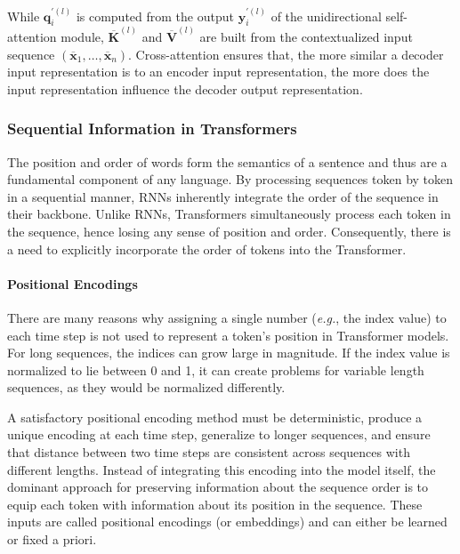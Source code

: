 \noindent While $\bm{q}^{\prime(l)}_i$ is computed from the output $\bm{y}^{\prime(l)}_i$ of the unidirectional self-attention module, $\overline{\bm{K}}^{(l)}$ and $\overline{\bm{V}}^{(l)}$ are built from the contextualized input sequence $(\overline{\bm{x}}_1, \ldots, \overline{\bm{x}}_n)$. Cross-attention ensures that, the more similar a decoder input representation is to an encoder input representation, the more does the input representation influence the decoder output representation.



\subsubsection{Sequential Information in Transformers}

The position and order of words form the semantics of a sentence and thus are a fundamental component of any language. By processing sequences token by token in a sequential manner, \acp{RNN} inherently integrate the order of the sequence in their backbone. Unlike \acp{RNN}, Transformers simultaneously process each token in the sequence, hence losing any sense of position and order. Consequently, there is a need to explicitly incorporate the order of tokens into the Transformer.

\paragraph{Positional Encodings} There are many reasons why assigning a single number (\textit{e.g.}, the index value) to each time step is not used to represent a token's position in Transformer models. For long sequences, the indices can grow large in magnitude. If the index value is normalized to lie between 0 and 1, it can create problems for variable length sequences, as they would be normalized differently. 

A satisfactory positional encoding method must be deterministic, produce a unique encoding at each time step, generalize to longer sequences, and ensure that distance between two time steps are consistent across sequences with different lengths. Instead of integrating this encoding into the model itself, the dominant approach for preserving information about the sequence order is to equip each token with information about its position in the sequence. These inputs are called positional encodings (or embeddings) and can either be learned or fixed a priori. %

